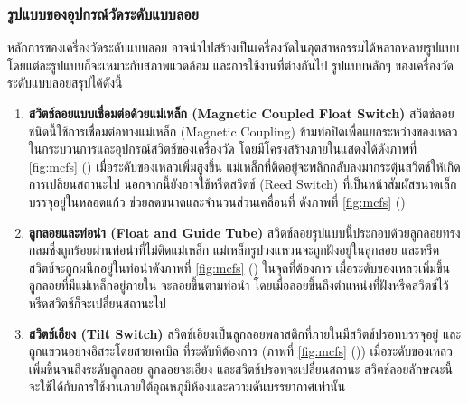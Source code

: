 \documentclass[final,11pt]{article}
\begin{document}
\subsubsection{รูปแบบของอุปกรณ์วัดระดับแบบลอย}
หลักการของเครื่องวัดระดับแบบลอย อาจนำไปสร้างเป็นเครื่องวัดในอุตสาหกรรมได้หลากหลายรูปแบบ โดยแต่ละรูปแบบก็จะเหมาะกับสภาพแวดล้อม 
และการใช้งานที่ต่างกันไป รูปแบบหลักๆ ของเครื่องวัดระดับแบบลอยสรุปได้ดังนี้
\begin{enumerate}
    \item \textbf{สวิตช์ลอยแบบเชื่อมต่อด้วยแม่เหล็ก (Magnetic Coupled Float Switch)} สวิตช์ลอยชนิดนี้ใช้การเชื่อมต่อทางแม่เหล็ก (Magnetic Coupling)
    ข้ามท่อปิดเพื่อแยกระหว่างของเหลวในกระบวนการและอุปกรณ์สวิตช์ของเครื่องวัด โดยมีโครงสร้างภายในแสดงได้ดังภาพที่  \ref{fig:mcfs} ()
    เมื่อระดับของเหลวเพิ่มสูงขึ้น  แม่เหล็กที่ติดอยู่จะพลิกกลับลงมากระตุ้นสวิตช์ให้เกิดการเปลี่ยนสถานะไป นอกจากนี้ยังอาจใช้หรีดสวิตช์ (Reed Switch) ที่เป็นหน้าสัมผัสขนาดเล็กบรรจุอยู่ในหลอดแก้ว 
    ช่วยลดขนาดและจำนวนส่วนเคลื่อนที่ ดังภาพที่ \ref{fig:mcfs} ()
    \item \textbf{ลูกลอยและท่อนำ (Float and Guide Tube)} สวิตช์ลอยรูปแบบนี้ประกอบด้วยลูกลอยทรงกลมซึ่งถูกร้อยผ่านท่อนำที่ไม่ติดแม่เหล็ก
    แม่เหล็กรูปวงแหวนจะถูกฝังอยู่ในลูกลอย และหรีดสวิตช์จะถูกผนึกอยู่ในท่อนำดังภาพที่ \ref{fig:mcfs} () ในจุดที่ต้องการ เมื่อระดับของเหลวเพิ่มขึ้น ลูกลอยที่มีแม่เหล็กอยู่ภายใน
    จะลอยขึ้นตามท่อนำ โดยเมื่อลอยขึ้นถึงตำแหน่งที่ฝังหรีดสวิตช์ไว้ หรีดสวิตช์ก็จะเปลี่ยนสถานะไป
    \item \textbf{สวิตช์เอียง (Tilt Switch)} สวิตช์เอียงเป็นลูกลอยพลาสติกที่ภายในมีสวิตช์ปรอทบรรจุอยู่ และถูกแขวนอย่างอิสระโดยสายเคเบิล 
    ที่ระดับที่ต้องการ (ภาพที่ \ref{fig:mcfs} ()) เมื่อระดับของเหลวเพิ่มขึ้นจนถึงระดับลูกลอย ลูกลอยจะเอียง และสวิตช์ปรอทจะเปลี่ยนสถานะ 
    สวิตช์ลอยลักษณะนี้จะใช้ได้กับการใช้งานภายใต้อุณหภูมิห้องและความดันบรรยากาศเท่านั้น
\end{enumerate}
\end{document}
